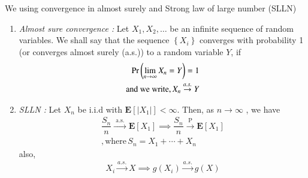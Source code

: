 We using convergence in almost surely and Strong law of large number (SLLN)
\begin{enumerate}
\item {\em Almost sure convergence : }Let $X_{1}, X_{2}, \ldots$ be an infinite sequence of random variables. We shall say that the sequence $\left\{X_{i}\right\}$ converges with probability 1 (or converges almost surely (a.s.)) to a random variable $Y$, if 
\begin{align}
\Pr\left(\lim _{n \rightarrow \infty} X_{n}=Y\right)=1 \\ 
\text{and we write}, X_{n} \stackrel{a . s .}{\rightarrow} Y
\end{align} 
\item {\em SLLN : }Let $X_{n}$ be i.i.d with $\mathbf{E}\left[\left|X_{1}\right|\right]<\infty$. Then, as $n \rightarrow \infty$ , we have
\begin{align}
\dfrac{S_{n}}{n} \stackrel{\text { a.s. }}{\rightarrow} \mathbf{E}\left[X_{1}\right]\implies \dfrac{S_{n}}{n} \stackrel{\text { P }}{\rightarrow} \mathbf{E}\left[X_{1}\right]\\
,\text{where} \, S_n = X_1 + \cdots + X_n
\end{align}   
also,
\begin{align}
X_i \stackrel{a.s.}{\rightarrow} X \implies g(X_i) \stackrel{a.s.}{\rightarrow} g(X)
\label{june/2017/104Eq}  
\end{align}
\end{enumerate}
